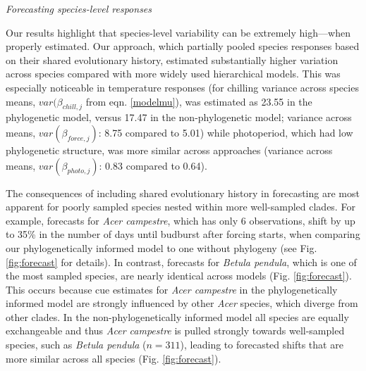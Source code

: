 \documentclass[11pt]{article}
\begin{document}
\emph{Forecasting species-level responses}

Our results highlight that species-level variability can be extremely high---when properly estimated. Our approach, which partially pooled species responses based on their shared evolutionary history, estimated substantially higher variation across species compared with more widely used hierarchical models. This was especially noticeable in temperature responses (for chilling variance across species means, $var(\beta_{chill,j}$ from eqn. \ref{modelmu}), was estimated as 23.55 in the phylogenetic model, versus 17.47 in the non-phylogenetic model; variance across means, $var(\beta_{force,j})$: 8.75 compared to 5.01) while photoperiod, which had low phylogenetic structure, was more similar across approaches (variance across means, $var(\beta_{photo,j})$: 0.83 compared to 0.64). %

The consequences of including shared evolutionary history in forecasting are most apparent for poorly sampled species nested within more well-sampled clades. For example, forecasts for \emph{Acer campestre}, which has only 6 observations, shift by up to 35\% in the number of days until budburst after forcing starts, when comparing our phylogenetically informed model to one without phylogeny (see Fig. \ref{fig:forecast} for details). In contrast, forecasts for \emph{Betula pendula}, which is one of the most sampled species, are nearly identical across models (Fig. \ref{fig:forecast}). This occurs because cue estimates for \emph{Acer campestre} in the phylogenetically informed model are strongly influenced by other \emph{Acer} species, which diverge from other clades. In the non-phylogenetically informed model all species are equally exchangeable and thus \emph{Acer campestre} is pulled strongly towards well-sampled species, such as \emph{Betula pendula} ($n = 311$), leading to forecasted shifts that are more similar across all species (Fig. \ref{fig:forecast}). 
\end{document}
